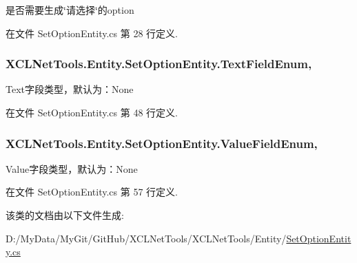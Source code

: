 是否需要生成\char`\"{}请选择\char`\"{}的option 



在文件 Set\-Option\-Entity.\-cs 第 28 行定义.

\hypertarget{class_x_c_l_net_tools_1_1_entity_1_1_set_option_entity_a73ab171debc846e282a87565cf7baf96}{
\subsubsection[{Text\-Field\-Enum}]{ X\-C\-L\-Net\-Tools.\-Entity.\-Set\-Option\-Entity.\-Text\-Field\-Enum\hspace{0.3cm}{\ttfamily [get]}, {\ttfamily [set]}}}\label{class_x_c_l_net_tools_1_1_entity_1_1_set_option_entity_a73ab171debc846e282a87565cf7baf96}


Text字段类型，默认为：\-None 



在文件 Set\-Option\-Entity.\-cs 第 48 行定义.

\hypertarget{class_x_c_l_net_tools_1_1_entity_1_1_set_option_entity_a3f5eebe69ef0bc0e2c184f9d8d65fbaf}{
\subsubsection[{Value\-Field\-Enum}]{ X\-C\-L\-Net\-Tools.\-Entity.\-Set\-Option\-Entity.\-Value\-Field\-Enum\hspace{0.3cm}{\ttfamily [get]}, {\ttfamily [set]}}}\label{class_x_c_l_net_tools_1_1_entity_1_1_set_option_entity_a3f5eebe69ef0bc0e2c184f9d8d65fbaf}


Value字段类型，默认为：\-None 



在文件 Set\-Option\-Entity.\-cs 第 57 行定义.



该类的文档由以下文件生成\-:\begin{DoxyCompactItemize}
\item 
D\-:/\-My\-Data/\-My\-Git/\-Git\-Hub/\-X\-C\-L\-Net\-Tools/\-X\-C\-L\-Net\-Tools/\-Entity/\hyperlink{_set_option_entity_8cs}{Set\-Option\-Entity.\-cs}\end{DoxyCompactItemize}

